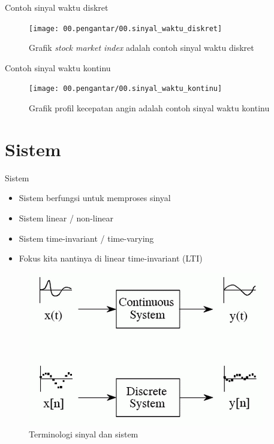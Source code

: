 \documentclass[aspectratio=169]{beamer}
\begin{document}
\begin{frame}{Contoh sinyal waktu diskret}
	\begin{figure}
		\texttt{[image: 00.pengantar/00.sinyal\_waktu\_diskret]}
		\caption{Grafik \textit{stock market index} adalah contoh sinyal waktu diskret}
	\end{figure}
\end{frame}

\begin{frame}{Contoh sinyal waktu kontinu}

	\begin{figure}
		\texttt{[image: 00.pengantar/00.sinyal\_waktu\_kontinu]}
		\caption{Grafik profil kecepatan angin adalah contoh sinyal waktu kontinu}
	\end{figure}
\end{frame}


\section{Sistem}

\begin{frame}{Sistem}
	\begin{multicols}{2}
		\begin{itemize}
			\item Sistem berfungsi untuk memproses sinyal
			\item Sistem linear / non-linear
			\item Sistem time-invariant / time-varying
			\item Fokus kita nantinya di linear time-invariant (LTI)
		\end{itemize}
		\vfill\null
		\columnbreak
		\begin{figure}
			\centering
			\includegraphics[height=0.5 \textheight]{gambar/00.pengantar/00.sistem}
			\caption{Terminologi sinyal dan sistem}
		\end{figure}
	\end{multicols}
\end{frame}
\end{document}
